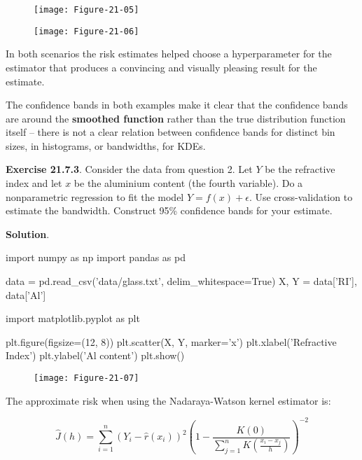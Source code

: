 \begin{figure}[H]
\texttt{[image: Figure-21-05]}
\end{figure}

\begin{figure}[H]
\texttt{[image: Figure-21-06]}
\end{figure}

In both scenarios the risk estimates helped choose a hyperparameter for
the estimator that produces a convincing and visually pleasing result
for the estimate.

The confidence bands in both examples make it clear that the confidence
bands are around the \textbf{smoothed function} rather than the true
distribution function itself -- there is not a clear relation between
confidence bands for distinct bin sizes, in histograms, or bandwidths,
for KDEs.

\textbf{Exercise 21.7.3}. Consider the data from question 2. Let \(Y\)
be the refractive index and let \(x\) be the aluminium content (the
fourth variable). Do a nonparametric regression to fit the model
\(Y = f(x) + \epsilon\). Use cross-validation to estimate the bandwidth.
Construct 95\% confidence bands for your estimate.

\textbf{Solution}.

\begin{python}
import numpy as np
import pandas as pd

data = pd.read_csv('data/glass.txt', delim_whitespace=True)
X, Y = data['RI'], data['Al']
\end{python}

\begin{python}
import matplotlib.pyplot as plt

plt.figure(figsize=(12, 8))
plt.scatter(X, Y, marker='x')
plt.xlabel('Refractive Index')
plt.ylabel('Al content')
plt.show()
\end{python}

\begin{figure}[H]
\texttt{[image: Figure-21-07]}
\end{figure}

The approximate risk when using the Nadaraya-Watson kernel estimator is:

\[ \hat{J}(h) = \sum_{i=1}^n (Y_i - \hat{r}(x_i))^2 \left( 1 - \frac{K(0)}{\sum_{j=1}^n K \left( \frac{x_i - x_j}{h} \right)} \right)^{-2}\]

